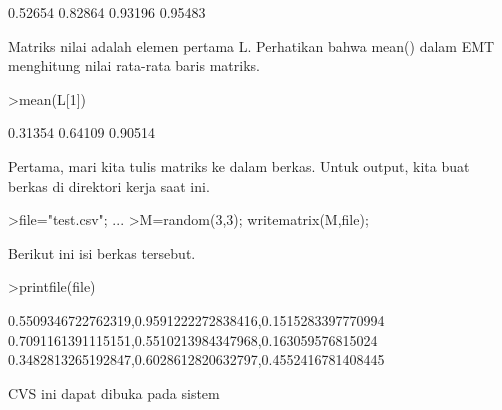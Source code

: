 \documentclass[a4paper,10pt]{article}
\begin{document}
\begin{eulernotebook}
\begin{eulercomment}
\begin{eulercomment}
\begin{eulercomment}
\begin{eulercomment}
\begin{eulercomment}
\begin{eulercomment}
\begin{eulercomment}
\begin{eulercomment}
\begin{eulercomment}
\begin{eulercomment}
\begin{eulercomment}
\begin{eulercomment}
\begin{eulercomment}
\begin{eulercomment}
\begin{eulercomment}
\begin{eulercomment}
\begin{eulercomment}
\begin{eulercomment}
\begin{eulercomment}
\begin{eulercomment}
\begin{eulercomment}
\begin{eulercomment}
\begin{eulercomment}
\begin{eulercomment}
\begin{eulercomment}
\begin{eulercomment}
\begin{eulercomment}
\begin{eulercomment}
\begin{eulercomment}
\begin{eulercomment}
\begin{eulercomment}
\begin{eulercomment}
\begin{eulercomment}
\begin{eulercomment}
\begin{eulercomment}
\begin{eulercomment}
\begin{eulercomment}
\begin{eulercomment}
\begin{eulercomment}
\begin{eulercomment}
\begin{eulercomment}
\begin{eulercomment}
\begin{eulercomment}
\begin{eulercomment}
\begin{eulercomment}
\begin{eulercomment}
\begin{eulercomment}
\begin{eulercomment}
\begin{eulercomment}
\begin{eulercomment}
\begin{eulercomment}
\begin{eulercomment}
\begin{eulercomment}
\begin{eulercomment}
\begin{eulercomment}
\begin{eulercomment}
\begin{eulercomment}
\begin{eulercomment}
\begin{eulercomment}
\begin{eulercomment}
\begin{eulercomment}
\begin{eulercomment}
\begin{eulercomment}
\begin{eulercomment}
\begin{eulercomment}
\begin{eulercomment}
\begin{eulercomment}
\begin{eulercomment}
\begin{eulercomment}
\begin{eulercomment}
\begin{euleroutput}
0.52654
     0.82864   0.93196   0.95483
\end{euleroutput}
\begin{eulercomment}
Matriks nilai adalah elemen pertama L. Perhatikan bahwa mean() dalam
EMT menghitung nilai rata-rata baris matriks.
\end{eulercomment}
\begin{eulerprompt}
>mean(L[1])
\end{eulerprompt}
\begin{euleroutput}
    0.31354 
    0.64109 
    0.90514 
\end{euleroutput}
\begin{eulercomment}
Pertama, mari kita tulis matriks ke dalam berkas. Untuk output, kita
buat berkas di direktori kerja saat ini.
\end{eulercomment}
\begin{eulerprompt}
>file="test.csv";  ...
>M=random(3,3); writematrix(M,file);
\end{eulerprompt}
\begin{eulercomment}
Berikut ini isi berkas tersebut.
\end{eulercomment}
\begin{eulerprompt}
>printfile(file)
\end{eulerprompt}
\begin{euleroutput}
  0.5509346722762319,0.9591222272838416,0.1515283397770994
  0.7091161391115151,0.5510213984347968,0.163059576815024
  0.3482813265192847,0.6028612820632797,0.4552416781408445
  
\end{euleroutput}
\begin{eulercomment}
CVS ini dapat dibuka pada sistem 
\end{eulercomment}
\end{eulercomment}
\end{eulercomment}
\end{eulercomment}
\end{eulercomment}
\end{eulercomment}
\end{eulercomment}
\end{eulercomment}
\end{eulercomment}
\end{eulercomment}
\end{eulercomment}
\end{eulercomment}
\end{eulercomment}
\end{eulercomment}
\end{eulercomment}
\end{eulercomment}
\end{eulercomment}
\end{eulercomment}
\end{eulercomment}
\end{eulercomment}
\end{eulercomment}
\end{eulercomment}
\end{eulercomment}
\end{eulercomment}
\end{eulercomment}
\end{eulercomment}
\end{eulercomment}
\end{eulercomment}
\end{eulercomment}
\end{eulercomment}
\end{eulercomment}
\end{eulercomment}
\end{eulercomment}
\end{eulercomment}
\end{eulercomment}
\end{eulercomment}
\end{eulercomment}
\end{eulercomment}
\end{eulercomment}
\end{eulercomment}
\end{eulercomment}
\end{eulercomment}
\end{eulercomment}
\end{eulercomment}
\end{eulercomment}
\end{eulercomment}
\end{eulercomment}
\end{eulercomment}
\end{eulercomment}
\end{eulercomment}
\end{eulercomment}
\end{eulercomment}
\end{eulercomment}
\end{eulercomment}
\end{eulercomment}
\end{eulercomment}
\end{eulercomment}
\end{eulercomment}
\end{eulercomment}
\end{eulercomment}
\end{eulercomment}
\end{eulercomment}
\end{eulercomment}
\end{eulercomment}
\end{eulercomment}
\end{eulercomment}
\end{eulercomment}
\end{eulercomment}
\end{eulercomment}
\end{eulercomment}
\end{eulercomment}
\end{eulernotebook}
\end{document}
